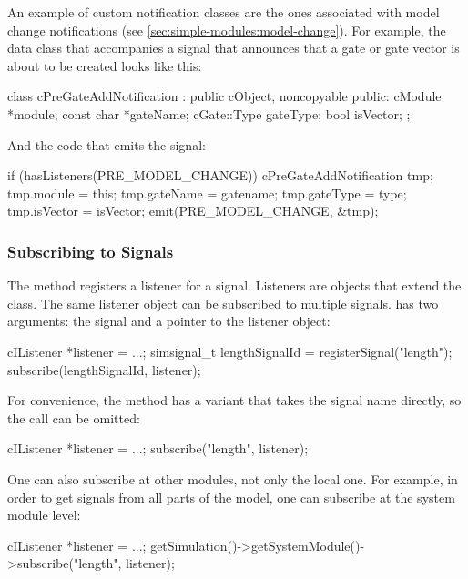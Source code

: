 An example of custom notification classes are the ones associated with
model change notifications (see \ref{sec:simple-modules:model-change}).
For example, the data class that accompanies a signal that announces that a
gate or gate vector is about to be created looks like this:

\begin{cpp}
class cPreGateAddNotification : public cObject, noncopyable
{
  public:
    cModule *module;
    const char *gateName;
    cGate::Type gateType;
    bool isVector;
};
\end{cpp}

And the code that emits the signal:

\begin{cpp}
if (hasListeners(PRE_MODEL_CHANGE))
{
    cPreGateAddNotification tmp;
    tmp.module = this;
    tmp.gateName = gatename;
    tmp.gateType = type;
    tmp.isVector = isVector;
    emit(PRE_MODEL_CHANGE, &tmp);
}
\end{cpp}


\subsubsection{Subscribing to Signals}
\label{sec:simple-modules:subscribing-to-signals}

The  method registers a listener for a signal.
Listeners are objects that extend the  class.
The same listener object can be subscribed to multiple signals.
 has two arguments: the signal and a pointer to
the listener object:

\begin{cpp}
cIListener *listener = ...;
simsignal_t lengthSignalId = registerSignal("length");
subscribe(lengthSignalId, listener);
\end{cpp}

For convenience, the  method has a variant
that takes the signal name directly, so the 
call can be omitted:

\begin{cpp}
cIListener *listener = ...;
subscribe("length", listener);
\end{cpp}

One can also subscribe at other modules, not only the local one.
For example, in order to get signals from all parts of the model,
one can subscribe at the system module level:

\begin{cpp}
cIListener *listener = ...;
getSimulation()->getSystemModule()->subscribe("length", listener);
\end{cpp}

